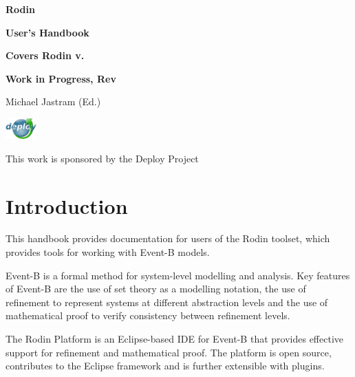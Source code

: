 \documentclass[12pt]{book}
\begin{document}
\begin{titlepage}
\AddToShipoutPicture*{\BackgroundPic}
\vspace*{14.5cm}
{\fontsize{70}{85}\selectfont \bfseries Rodin}

\vspace*{0.2cm}
{\fontsize{24.5}{30}\selectfont \bfseries User's Handbook}

\vspace*{1cm}
{\fontsize{16}{19}\selectfont \textbf{\textsf{Covers Rodin v.\versionnr}}}

\vspace*{0.2cm}
{\fontsize{16}{19}\selectfont \textbf{\textsf{Work in Progress, $ $Rev$ $}}}

\vspace*{1cm}
{\fontsize{16}{19}\selectfont \textsf{Michael Jastram (Ed.)}}

\vspace*{1cm}
\includegraphics[width=12mm]{img/deploy-logo.png}

\vspace*{-8.4mm}
\hspace*{12mm}
{ \fontsize{11}{15}\selectfont \textsf{This work is sponsored by the Deploy Project}}

\vspace*{-22mm}

\end{titlepage}
\tableofcontents
\fi

\chapter{Introduction}

This handbook provides documentation for users of the Rodin toolset, which provides tools for working with Event-B models.

Event-B is a formal method for system-level modelling and analysis. Key features of Event-B are the use of set theory as a modelling notation, the use of refinement to represent systems at different abstraction levels and the use of mathematical proof to verify consistency between refinement levels.

The Rodin Platform is an Eclipse-based IDE for Event-B that provides effective support for refinement and mathematical proof. The platform is open source, contributes to the Eclipse framework and is further extensible with plugins. 
\end{document}
